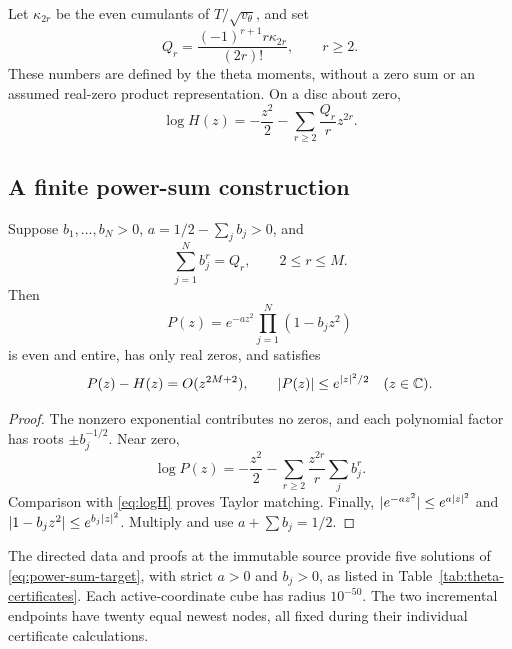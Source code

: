 Let $\kappa_{2r}$ be the even cumulants of $T/\sqrt{v_\theta}$, and set
\begin{equation}\label{eq:Qr}
 Q_r=\frac{(-1)^{r+1}r\kappa_{2r}}{(2r)!},\qquad r\ge2.
\end{equation}
These numbers are defined by the theta moments, without a zero sum or an assumed real-zero product representation. On a disc about zero,
\begin{equation}\label{eq:logH}
 \log H(z)=-\frac{z^2}{2}-\sum_{r\ge2}\frac{Q_r}{r}z^{2r}.
\end{equation}

\subsection{A finite power-sum construction}
\begin{proposition}\label{prop:finite-P}
Suppose $b_1,\ldots,b_N>0$, $a=1/2-\sum_jb_j>0$, and
\begin{equation}\label{eq:power-sum-target}
 \sum_{j=1}^N b_j^r=Q_r,\qquad 2\le r\le M.
\end{equation}
Then
\[
 P(z)=e^{-az^2}\prod_{j=1}^N(1-b_jz^2)
\]
is even and entire, has only real zeros, and satisfies
\begin{equation}\label{eq:P-envelope}
 P(z)-H(z)=O(z^{2M+2}),\qquad
 \lvert P(z)\rvert\le e^{\lvert z\rvert^2/2}\quad(z\in\mathbb C).
\end{equation}
\end{proposition}
\begin{proof}
The nonzero exponential contributes no zeros, and each polynomial factor has roots $\pm b_j^{-1/2}$. Near zero,
\[
 \log P(z)=-\frac{z^2}{2}
       -\sum_{r\ge2}\frac{z^{2r}}r\sum_jb_j^r.
\]
Comparison with \eqref{eq:logH} proves Taylor matching. Finally,
$\lvert e^{-az^2}\rvert\le e^{a\lvert z\rvert^2}$ and
$\lvert1-b_jz^2\rvert\le e^{b_j\lvert z\rvert^2}$. Multiply and use $a+\sum b_j=1/2$.
\end{proof}

\begin{certificate}\label{cert:theta26}
The directed data and proofs at the immutable source \cite{R1003} provide five solutions of \eqref{eq:power-sum-target}, with strict $a>0$ and $b_j>0$, as listed in Table~\ref{tab:theta-certificates}. Each active-coordinate cube has radius $10^{-50}$. The two incremental endpoints have twenty equal newest nodes, all fixed during their individual certificate calculations.
\end{certificate}

